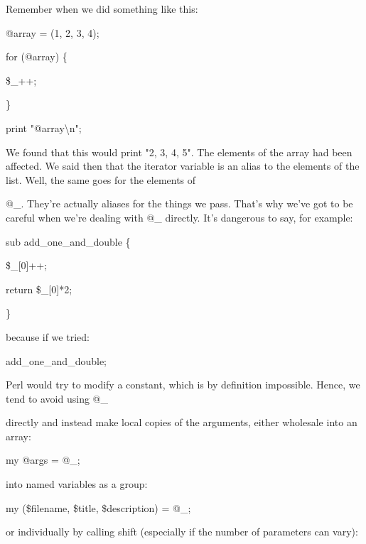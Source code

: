 \documentclass[a4paper,11pt]{book}
\begin{document}
\noindent 

\noindent Remember when we did something like this:

\noindent 

\noindent 

\noindent @array = (1, 2, 3, 4);

\noindent for (@array) \{

\noindent \$\_++;

\noindent \}

\noindent print "@array\textbackslash n";

\noindent 

\noindent We found that this would print "2, 3, 4, 5". The elements of the array had been affected. We said then that the iterator variable is an alias to the elements of the list. Well, the same goes for the elements of

\noindent @\_. They're actually aliases for the things we pass. That's why we've got to be careful when we're dealing with @\_   directly. It's dangerous to say, for example:

\noindent 

\noindent sub add\_one\_and\_double \{

\noindent \$\_[0]++;

\noindent return \$\_[0]*2;

\noindent \}

\noindent 

\noindent because if we tried:
\noindent 

\noindent 

\noindent add\_one\_and\_double;

\noindent 

\noindent 

\noindent Perl would try to modify a constant, which is by definition impossible. Hence, we tend to avoid using @\_

\noindent directly and instead make local copies of the arguments, either wholesale into an array:

\noindent 

\noindent my @args = @\_;

\noindent 

\noindent into named variables as a group:

\noindent 

\noindent my (\$filename, \$title, \$description) = @\_;

\noindent 

\noindent or individually by calling shift (especially if the number of parameters can vary):
\end{document}
